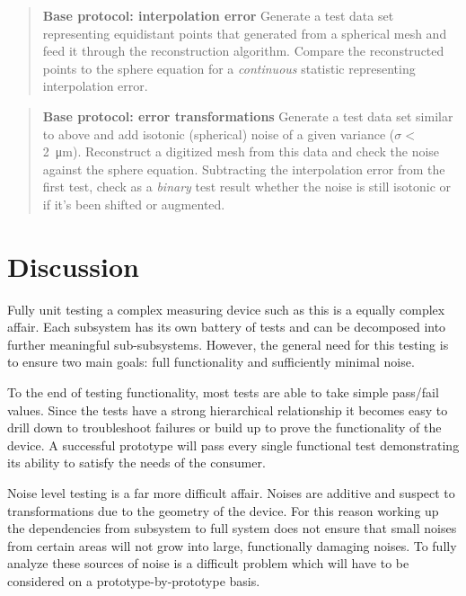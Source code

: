 \documentclass{article}
\begin{document}
\begin{quotation}
  \textbf{Base protocol: interpolation error} Generate a test data set   representing equidistant points that generated from a spherical mesh   and feed it through the reconstruction algorithm. Compare the   reconstructed points to the sphere equation for a   \textit{continuous} statistic representing interpolation error.
\end{quotation}

\begin{quotation}
  \textbf{Base protocol: error transformations} Generate a test data   set similar to above and add isotonic (spherical) noise of a given   variance ($\sigma <$ \SI{2}{\micro m}). Reconstruct a digitized mesh   from this data and check the noise against the sphere equation.   Subtracting the interpolation error from the first test, check as a   \textit{binary} test result whether the noise is still isotonic or   if it's been shifted or augmented.
\end{quotation}

\section{Discussion}
\label{sec:discussion}

Fully unit testing a complex measuring device such as this is a equally complex affair. Each subsystem has its own battery of tests and can be decomposed into further meaningful sub-subsystems. However, the general need for this testing is to ensure two main goals: full functionality and sufficiently minimal noise.

To the end of testing functionality, most tests are able to take simple pass/fail values. Since the tests have a strong hierarchical relationship it becomes easy to drill down to troubleshoot failures or build up to prove the functionality of the device. A successful prototype will pass every single functional test demonstrating its ability to satisfy the needs of the consumer.

Noise level testing is a far more difficult affair. Noises are additive and suspect to transformations due to the geometry of the device. For this reason working up the dependencies from subsystem to full system does not ensure that small noises from certain areas will not grow into large, functionally damaging noises. To fully analyze these sources of noise is a difficult problem which will have to be considered on a prototype-by-prototype basis.
\end{document}
